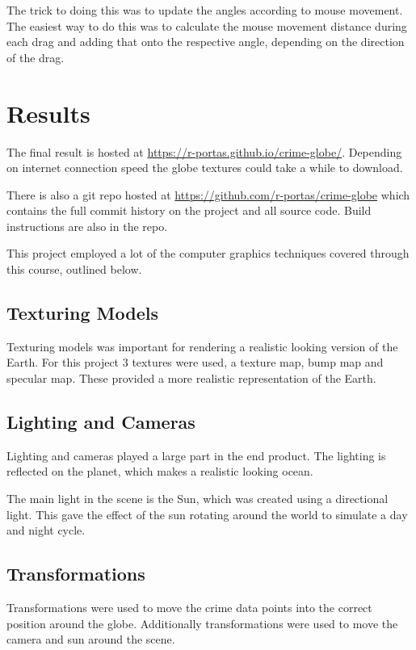 \documentclass[]{article}
\begin{document}
The trick to doing this was to update the angles according to mouse movement.
The easiest way to do this was to calculate the mouse movement distance during
each drag and adding that onto the respective angle, depending on the direction of the drag.


\section{Results}

The final result is hosted at \url{https://r-portas.github.io/crime-globe/}.
Depending on internet connection speed the globe textures could take a while to download.

There is also a git repo hosted at \url{https://github.com/r-portas/crime-globe} which contains the
full commit history on the project and all source code.
Build instructions are also in the repo.

This project employed a lot of the computer graphics techniques covered through this course, outlined below.

\subsection{Texturing Models}

Texturing models was important for rendering a realistic looking version of the Earth.
For this project 3 textures were used, a texture map, bump map and specular map.
These provided a more realistic representation of the Earth.

\subsection{Lighting and Cameras}

Lighting and cameras played a large part in the end product.
The lighting is reflected on the planet, which makes a realistic looking ocean.

The main light in the scene is the Sun, which was created using a directional light.
This gave the effect of the sun rotating around the world to simulate a day and night cycle.

\subsection{Transformations}

Transformations were used to move the crime data points into the correct position around the globe.
Additionally transformations were used to move the camera and sun around the scene.
\end{document}
